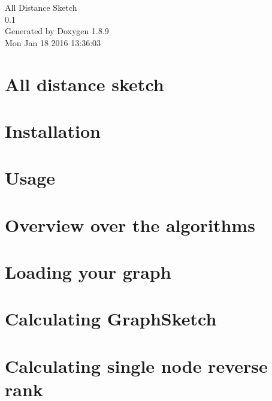 \documentclass[twoside]{book}
\newcommand{\+}{\discretionary{\mbox{\scriptsize$\hookleftarrow$}}{}{}}
\newcommand{\clearemptydoublepage}{%
  \newpage{\pagestyle{empty}\cleardoublepage}%
}
\begin{document}
\hypersetup{pageanchor=false,
             bookmarks=true,
             bookmarksnumbered=true,
             pdfencoding=unicode
            }
\begin{titlepage}
\vspace*{7cm}
\begin{center}%
{\Large All Distance Sketch \\[1ex]\large 0.\+1 }\\
\vspace*{1cm}
{\large Generated by Doxygen 1.8.9}\\
\vspace*{0.5cm}
{\small Mon Jan 18 2016 13:36:03}\\
\end{center}
\end{titlepage}
\clearemptydoublepage
\tableofcontents
\clearemptydoublepage
{}
\hypersetup{pageanchor=true}

\chapter{All distance sketch}
\label{index}\hypertarget{index}{}
\chapter{Installation}
\label{Install}
\hypertarget{Install}{}

\chapter{Usage}
\label{usage}
\hypertarget{usage}{}

\chapter{Overview over the algorithms}
\label{Overview}
\hypertarget{Overview}{}

\chapter{Loading your graph}
\label{GraphTut}
\hypertarget{GraphTut}{}

\chapter{Calculating Graph\+Sketch}
\label{GraphSketchTut}
\hypertarget{GraphSketchTut}{}

\chapter{Calculating single node reverse rank}
\label{ReverseRankTut}
\hypertarget{ReverseRankTut}{}

\end{document}

